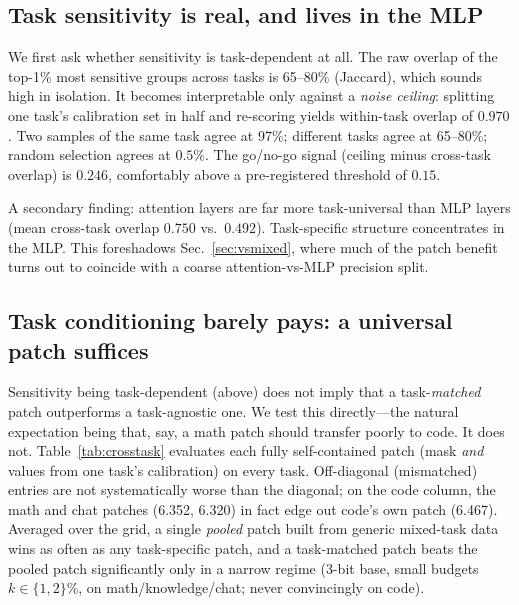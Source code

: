 \documentclass[11pt]{article}
\begin{document}
\subsection{Task sensitivity is real, and lives in the MLP}
\label{sec:atlas}
We first ask whether sensitivity is task-dependent at all. The raw overlap of
the top-1\% most sensitive groups across tasks is 65--80\% (Jaccard), which
sounds high in isolation. It becomes interpretable only against a
\emph{noise ceiling}: splitting one task's calibration set in half and
re-scoring yields within-task overlap of $0.970$. Two samples of the same task
agree at 97\%; different tasks agree at 65--80\%; random selection agrees at
$0.5\%$. The go/no-go signal (ceiling minus cross-task overlap) is $0.246$,
comfortably above a pre-registered threshold of $0.15$.

A secondary finding: attention layers are far more task-universal than MLP
layers (mean cross-task overlap $0.750$ vs.\ $0.492$). Task-specific structure
concentrates in the MLP. This foreshadows Sec.~\ref{sec:vsmixed}, where
much of the patch benefit turns out to coincide with a coarse
attention-vs-MLP precision split.

\subsection{Task conditioning barely pays: a universal patch suffices}
\label{sec:crosstask}
Sensitivity being task-dependent (above) does not imply that a task-\emph{matched}
patch outperforms a task-agnostic one. We test this directly---the natural
expectation being that, say, a math patch should transfer poorly to code. It
does not. Table~\ref{tab:crosstask} evaluates each fully self-contained patch
(mask \emph{and} values from one task's calibration) on every task. Off-diagonal
(mismatched) entries are not systematically worse than the diagonal; on the code
column, the math and chat patches (6.352, 6.320) in fact edge out code's own
patch (6.467). Averaged over the grid, a single \emph{pooled} patch built from
generic mixed-task data wins as often as any task-specific patch, and a
task-matched patch beats the pooled patch significantly only in a narrow regime
(3-bit base, small budgets $k\!\in\!\{1,2\}\%$, on math/knowledge/chat; never
convincingly on code).
\end{document}
